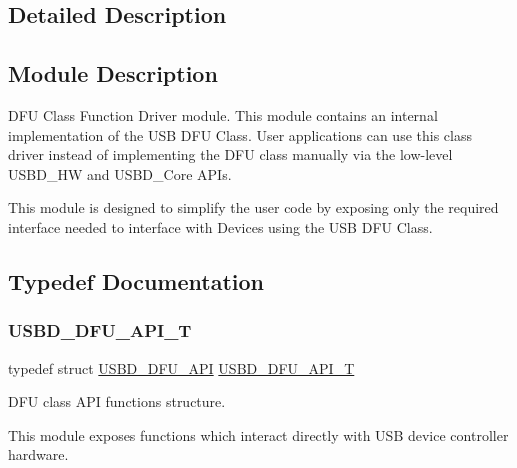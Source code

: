 \subsection{Detailed Description}
\hypertarget{group___u_s_b_d___m_s_c_Sec_MSCModDescription}{}\subsection{Module Description}\label{group___u_s_b_d___m_s_c_Sec_MSCModDescription}
D\+FU Class Function Driver module. This module contains an internal implementation of the U\+SB D\+FU Class. User applications can use this class driver instead of implementing the D\+FU class manually via the low-\/level U\+S\+B\+D\+\_\+\+HW and U\+S\+B\+D\+\_\+\+Core A\+P\+Is.

This module is designed to simplify the user code by exposing only the required interface needed to interface with Devices using the U\+SB D\+FU Class. 

\subsection{Typedef Documentation}
\mbox{\label{group___u_s_b_d___d_f_u_gadf9281f8af1223053e3ccf48e26ac80d}} 
\subsubsection{\texorpdfstring{U\+S\+B\+D\+\_\+\+D\+F\+U\+\_\+\+A\+P\+I\+\_\+T}{USBD\_DFU\_API\_T}}
{\footnotesize\ttfamily typedef struct \hyperlink{struct_u_s_b_d___d_f_u___a_p_i}{U\+S\+B\+D\+\_\+\+D\+F\+U\+\_\+\+A\+PI}  \hyperlink{group___u_s_b_d___d_f_u_gadf9281f8af1223053e3ccf48e26ac80d}{U\+S\+B\+D\+\_\+\+D\+F\+U\+\_\+\+A\+P\+I\+\_\+T}}



D\+FU class A\+PI functions structure.

This module exposes functions which interact directly with U\+SB device controller hardware. 

